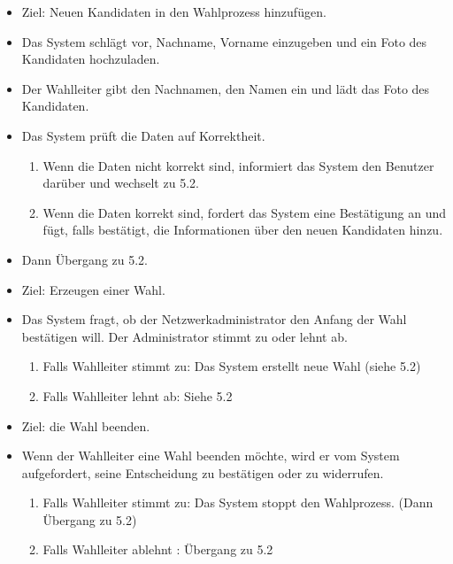 \documentclass[parskip=full,11pt,twoside]{scrartcl}
\begin{document}
\begin{itemize}
	\item Ziel: Neuen Kandidaten in den Wahlprozess hinzufügen.
	\item Das System schlägt vor, Nachname, Vorname einzugeben und ein Foto des Kandidaten hochzuladen.
	\item Der Wahlleiter gibt den Nachnamen, den Namen ein und lädt das Foto des Kandidaten.
	\item Das System prüft die Daten auf Korrektheit.
	\begin{enumerate}
		\item Wenn die Daten nicht korrekt sind, informiert das System den Benutzer darüber und wechselt zu 5.2.
		\item Wenn die Daten korrekt sind, fordert das System eine Bestätigung an und fügt, falls bestätigt, die Informationen über den neuen Kandidaten hinzu.
	\end{enumerate}
	\item Dann Übergang zu 5.2.
\end{itemize}


\begin{itemize}
	\item Ziel: Erzeugen einer Wahl.
	\item Das System fragt, ob der Netzwerkadministrator den Anfang der Wahl bestätigen will.
	Der Administrator stimmt zu oder lehnt ab.
	\begin{enumerate}
		\item Falls Wahlleiter stimmt zu: Das System erstellt neue Wahl (siehe 5.2)
		\item Falls Wahlleiter lehnt ab: Siehe 5.2
	\end{enumerate}
\end{itemize}


\begin{itemize}
	\item Ziel: die Wahl beenden.
	\item Wenn der Wahlleiter eine Wahl beenden möchte, wird er vom System aufgefordert, seine Entscheidung zu bestätigen oder zu widerrufen.
	\begin{enumerate}
		\item Falls Wahlleiter stimmt zu: Das System stoppt den Wahlprozess. (Dann Übergang zu 5.2)
		\item Falls Wahlleiter ablehnt : Übergang zu 5.2
	\end{enumerate}
\end{itemize}
\end{document}
